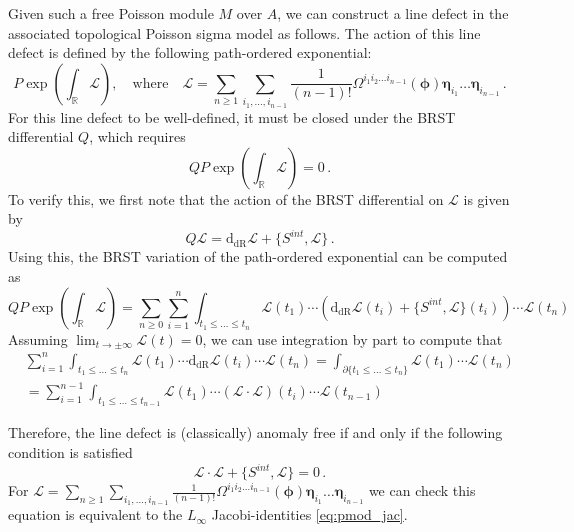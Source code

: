 \documentclass[11pt]{article}
\newcommand{\R}{\mathbb{R}}
\newcommand{\derham}{\mathrm{dR}}
\numberwithin{equation}{section}
\begin{document}
Given such a free Poisson module $M$ over $A$, we can construct a line defect in the associated topological Poisson sigma model as follows. The action of this line defect is defined by the following path-ordered exponential:
\begin{equation}
	P\exp\left(\int_{\R} \mathcal{L} \right), \quad \text{where} \quad \mathcal{L} = \sum_{n\geq 1}\sum_{i_1,\dots,i_{n-1}}\frac{1}{(n-1)!}\Omega^{i_1i_2\dots i_{n-1}}(\boldsymbol{\phi})\boldsymbol{\eta}_{i_1}\dots \boldsymbol{\eta}_{i_{n-1}}\,.
\end{equation}
For this line defect to be well-defined, it must be closed under the BRST differential $Q$, which requires
\begin{equation}
	QP\exp\left(\int_{\R}\mathcal{L}\right) = 0 \,.
\end{equation}
To verify this, we first note that the action of the BRST differential on $\mathcal{L}$ is given by
\begin{equation}
	Q\mathcal{L} = \mathrm{d}_{\derham}\mathcal{L} + \{S^{int},\mathcal{L}\} \,.
\end{equation}
Using this, the BRST variation of the path-ordered exponential can be computed as
\begin{equation}
			QP\exp\left(\int_{\R}\mathcal{L}\right) = \sum_{n\geq 0}\sum_{i = 1}^n\int_{t_1 \leq \dots \leq t_n}\mathcal{L}(t_1)\cdots \left(\mathrm{d}_{\derham}\mathcal{L}(t_i) + \{S^{int},\mathcal{L}\}(t_i) \right) \cdots \mathcal{L}(t_n)
\end{equation}
Assuming $\lim_{t \to \pm \infty}\mathcal{L}(t) = 0$, we can use integration by part to compute that 
\begin{equation}
\begin{aligned}
	 			&\sum_{i = 1}^n\int_{t_1 \leq \dots \leq t_n}\mathcal{L}(t_1)\cdots \mathrm{d}_{\derham}\mathcal{L}(t_i)\cdots \mathcal{L}(t_n) =  \int_{\partial \{t_1 \leq \dots \leq t_n\}} \mathcal{L}(t_1)\cdots\mathcal{L}(t_n) \\
			& = \sum_{i = 1}^{n-1}\int_{t_1 \leq \dots \leq t_{n-1}}\mathcal{L}(t_1)\cdots \left(\mathcal{L}\cdot \mathcal{L}\right)(t_{i}) \cdots \mathcal{L}(t_{n-1})
\end{aligned}
\end{equation}

Therefore, the line defect is (classically) anomaly free if and only if the following condition is satisfied
\begin{equation}\label{eq:ano_free_line}
	\mathcal{L}\cdot \mathcal{L} + \{S^{int},\mathcal{L}\} = 0\,.
\end{equation}
For $\mathcal{L} = \sum_{n\geq 1}\sum_{i_1,\dots,i_{n-1}}\frac{1}{(n-1)!}\Omega^{i_1i_2\dots i_{n-1}}(\boldsymbol{\phi})\boldsymbol{\eta}_{i_1}\dots \boldsymbol{\eta}_{i_{n-1}}$ we can check this equation is equivalent to the $L_\infty$ Jacobi-identities \eqref{eq:pmod_jac}.
\end{document}
